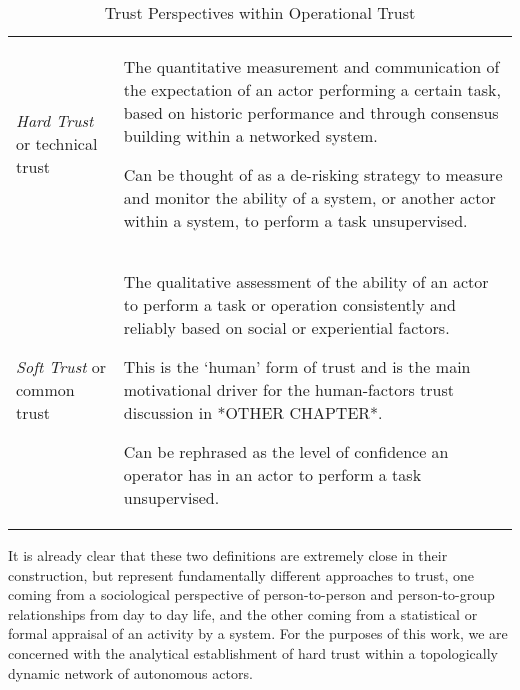 \begin{table}
  \begin{tabularx}{\textwidth}{p{3cm}X}\toprule
    \emph{Hard Trust} or technical trust & The quantitative measurement and communication of the expectation of an actor performing a certain task, based on historic performance and through consensus building within a networked system.\par
    Can be thought of as a de-risking strategy to measure and monitor the ability of a system, or another actor within a system, to perform a task unsupervised.\\
    \emph{Soft Trust} or common trust & The qualitative assessment of the ability of an actor to perform a task or operation consistently and reliably based on social or experiential factors.\par
    This is the ‘human’ form of trust and is the main motivational driver for the human-factors trust discussion in *OTHER CHAPTER*.\par
    Can be rephrased as the level of confidence an operator has in an actor to perform a task unsupervised.\\
    \bottomrule
  \end{tabularx}
  \caption{Trust Perspectives within Operational Trust}
  \label{tab:operational_trust_perspectives}
\end{table}

It is already clear that these two definitions are extremely close in their construction, but represent fundamentally different approaches to trust, one coming from a sociological perspective of person-to-person and person-to-group relationships from day to day life, and the other coming from a statistical or formal appraisal of an activity by a system.
For the purposes of this work, we are concerned with the analytical establishment of hard trust within a topologically dynamic network of autonomous actors.

